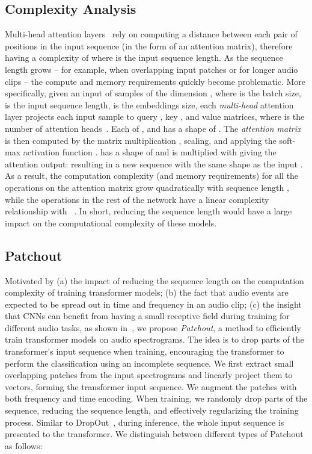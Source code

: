 \documentclass[a4paper]{article}
\begin{document}
\subsection{Complexity Analysis}
\label{sub:sec:complexity}
Multi-head attention layers~\cite{vaswani2017attention} rely on computing a distance between each pair of positions in the input sequence (in the form of an attention matrix), therefore having a complexity of  where  is the input sequence length. As the sequence length grows  -- for example, when overlapping input patches or for longer audio clips -- the compute and memory requirements quickly become problematic. More specifically, given an input of  samples of the dimension , where  is the batch size,  is the input sequence length,  is the embeddings size, each \emph{multi-head} attention layer projects 
each input sample to  query , key , and value  matrices, where  is the number of attention heads~\cite{vaswani2017attention}.  Each of ,  and  has a shape of . The \emph{attention matrix}  is then computed by the matrix multiplication , scaling, and applying the soft-max activation function .
  has a shape of  and is multiplied with  giving the attention output:  resulting in a new sequence with the same shape as the input .
As a result, the computation complexity (and memory requirements) for all the operations on the attention matrix  grow quadratically  with sequence length , while the operations in the rest of the network have a linear complexity relationship with ~\cite{vaswani2017attention,dosovitskiyB0WZ21VIT,TouvronCDMSJ21deit}.
In short, reducing the sequence length would have a large impact on the computational complexity of these models.


\subsection{Patchout}
\label{sec:patchdrop}
Motivated by (a) the impact of reducing the sequence length on the computation complexity of training transformer models; (b) the fact that audio events are expected to be spread out in time and frequency in an audio clip; (c) the insight that CNNs can benefit from having a small receptive field during training for different audio tasks, as shown in~\cite{Koutini2019Receptive}, we propose \emph{Patchout}, a method to efficiently train transformer models on audio spectrograms. The idea is to drop parts of the transformer's input sequence when training, encouraging the transformer to perform the classification using an incomplete sequence. We first extract small overlapping patches from the input spectrograms and linearly project them to vectors, forming the transformer input sequence. We augment the patches with both frequency and time encoding. When training, we randomly drop parts of the sequence, reducing the sequence length, and effectively regularizing the training process. Similar to DropOut~\cite{JMLR:v15:srivastava14a:dropout}, during inference, the whole input sequence is presented to the transformer.  We distinguish between different types of Patchout as follows: 
\end{document}
